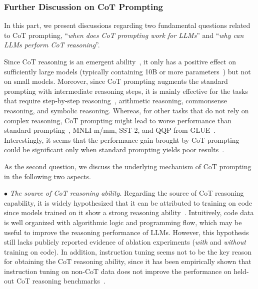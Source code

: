 \subsubsection{Further Discussion on CoT Prompting}
In this part, we present discussions regarding two fundamental questions related to CoT prompting, \ie ``\textit{when does CoT prompting work for LLMs}'' and ``\textit{why can LLMs perform CoT reasoning}''.

Since CoT reasoning is an emergent ability~\cite{Wei-arxiv-2022-Emergent}, it only has a positive effect on sufficiently large models (typically containing 10B or more parameters~\cite{Wei-arxiv-2022-chain}) but not on small models. 
Moreover, since CoT prompting augments the standard prompting with intermediate reasoning steps, it is mainly effective for the tasks that require step-by-step reasoning~\cite{Wei-arxiv-2022-chain}, \eg arithmetic reasoning, commonsense reasoning, and symbolic reasoning.
Whereas, for other tasks that do not rely on complex reasoning, CoT prompting might lead to worse performance than standard prompting~\cite{Wang-arxiv-2022-Rationale}, \eg MNLI-m/mm, SST-2, and QQP from GLUE~\cite{Wang-EMNLP-2018-GLUE}.   
Interestingly, it seems that the performance gain brought by CoT prompting could be significant only when standard prompting yields poor results~\cite{Wei-arxiv-2022-chain}.

As the second question, we discuss the underlying mechanism of CoT prompting in the following two aspects. 

$\bullet$ \emph{The source of CoT reasoning ability}. 
Regarding the source of CoT reasoning capability, it is widely hypothesized that it can be attributed to training on code since models trained on it show a strong reasoning ability~\cite{Liang-arxiv-2022-Holistic, FU-blog-2022-how, Bi-arxiv-2023-When}.   
Intuitively, code data is well organized with algorithmic logic and programming flow, which may be useful to improve the reasoning performance of LLMs. 
However, this hypothesis still lacks publicly reported evidence of ablation experiments (\emph{with} and \emph{without} training on code). 
In addition, instruction tuning seems not to be the key reason for obtaining the CoT reasoning ability, since 
it has been empirically shown that instruction tuning on non-CoT data does not improve the performance on held-out CoT reasoning benchmarks~\cite{Chung-arxiv-2022-Scaling}.


